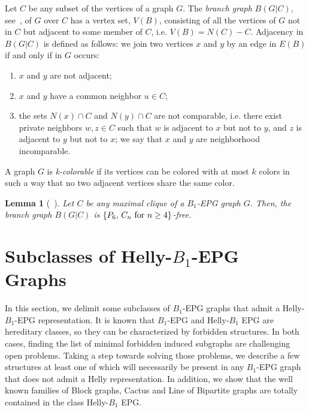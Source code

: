 \documentclass[9pt]{entcs}
\newtheorem{lema}[thm]{Lemma}%
\begin{document}
Let $C$ be any subset of the vertices of a graph $G$. The \textit{branch graph} $B(G|C)$, see~\cite{golumbic2009}, of $G$ over $C$ has a vertex set, $V(B)$, consisting of all the vertices of $G$ not in $C$ but adjacent to some member of $C$, i.e. $V(B) = N(C) - C$. Adjacency in $B(G|C)$ is defined as follows: we join two vertices $x$ and $y$ by an edge in $E(B)$ if and only if in $G$ occurs:
\begin{enumerate}
    \item  $x$ and $y$ are not adjacent;
    \item $x$ and $y$ have a common neighbor $u \in C$;
    \item the sets $N(x) \cap C$ and $N(y) \cap C$ are not comparable, i.e. there exist private neighbors $w, z \in C$ such that $w$ is adjacent to $x$ but not to $y$, and $z$ is adjacent to $y$ but not to $x$; we say that $x$ and $y$ are neighborhood incomparable.
\end{enumerate}

A graph $G$ is \textit{k-colorable} if its vertices can be colored with at most $k$ colors in such a way that no two adjacent vertices share the same color. 

\begin{lema}[~\cite{golumbic2009}] \label{l:branch} Let $C$ be any maximal clique of a $B_1$-EPG  graph $G$. Then, the branch graph $B(G|C)$ is $\{P_6, \, C_n \hbox{ for }  n\geq 4\}$-free.
\end{lema}





\section{Subclasses of Helly-$B_1$-EPG Graphs}

In this section, we delimit some  subclasses of $B_1$-EPG graphs that admit a Helly-$B_1$-EPG representation. It is known that $B_1$-EPG and Helly-$B_1$ EPG 
are hereditary classes, so they can  be characterized by forbidden structures. 
In both cases, finding the list of minimal forbidden induced subgraphs are challenging open problems.
Taking a step towards solving
those problems,  we describe a few structures %
at least one of which will  necessarily be present in  any $B_1$-EPG graph that does not admit a Helly representation. 
In addition,
we show that the well known families of Block graphs, Cactus and Line of Bipartite graphs are totally contained in the class Helly-$B_1$ EPG.
\end{document}

